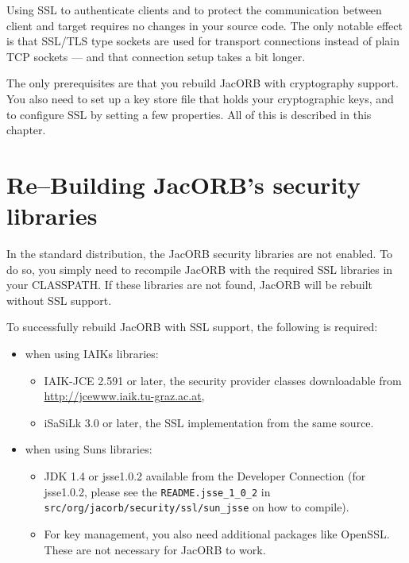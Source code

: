 

Using  SSL to authenticate  clients and  to protect  the communication
between client and target requires no changes in your source code. The
only  notable  effect  is  that  SSL/TLS type  sockets  are  used  for
transport  connections  instead of  plain  TCP  sockets  --- and  that
connection setup takes a bit longer.

The only  prerequisites are that you rebuild  JacORB with cryptography
support. You  also need  to set up  a key  store file that  holds your
cryptographic   keys,  and  to   configure  SSL   by  setting   a  few
properties. All of this is described in this chapter.

\section{Re--Building JacORB's security libraries}

In the  standard distribution, the  JacORB security libraries  are not
enabled.   To do  so, you  simply need  to recompile  JacORB  with the
required SSL libraries  in your CLASSPATH.  If these libraries
are not found, JacORB will be rebuilt without SSL support.

To  successfully rebuild  JacORB with  SSL support,  the  following is
required:

\begin{itemize}
        \item when using IAIKs libraries:
              \begin{itemize}
                \item IAIK-JCE 2.591 or later, the security provider classes
                downloadable from \\ \href{http://jcewww.iaik.tu-graz.ac.at}{http://jcewww.iaik.tu-graz.ac.at},
              \item iSaSiLk 3.0 or later, the SSL implementation from the same
                source.
              \end{itemize}

        \item when using Suns libraries:
              \begin{itemize}
              \item JDK 1.4 or jsse1.0.2 available from the Developer
                Connection (for jsse1.0.2, please see the {\tt README.jsse\_1\_0\_2} in
                {\tt src/org/jacorb/security/ssl/sun\_jsse} on how to compile).
              \item For key management, you also need additional packages like
                OpenSSL. These are not necessary for JacORB to work.
              \end{itemize}
\end{itemize}

